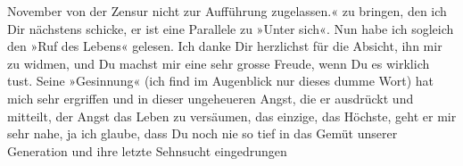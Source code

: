 \begin{ledgroupsized}[t]{13cm}
{{{                     November von der Zensur nicht zur Aufführung zugelassen.}}}\label{K_L01548_1h}« zu
               bringen, den ich Dir nächstens schicke, er ist eine Parallele zu »Unter sich«. Nun habe ich sogleich den »Ruf des Lebens« gelesen. Ich danke Dir herzlichst für die
               Absicht, ihn mir zu widmen, und Du machst mir eine sehr grosse Freude, wenn Du es
               wirklich tust. Seine »Gesinnung« (ich find im Augenblick nur dieses dumme Wort) hat
               mich sehr ergriffen und in \label{LL294-1v}dieser ungeheueren
                  Angst, die er ausdrückt und mitteilt, der Angst das Leben zu versäumen, das
                  einzige, das Höchste, geht er mir sehr nahe\label{LL294-1h}, ja ich glaube, dass Du noch
               nie so tief in das Gemüt unserer Generation und ihre letzte Sehnsucht eingedrungen

\end{ledgroupsized}
